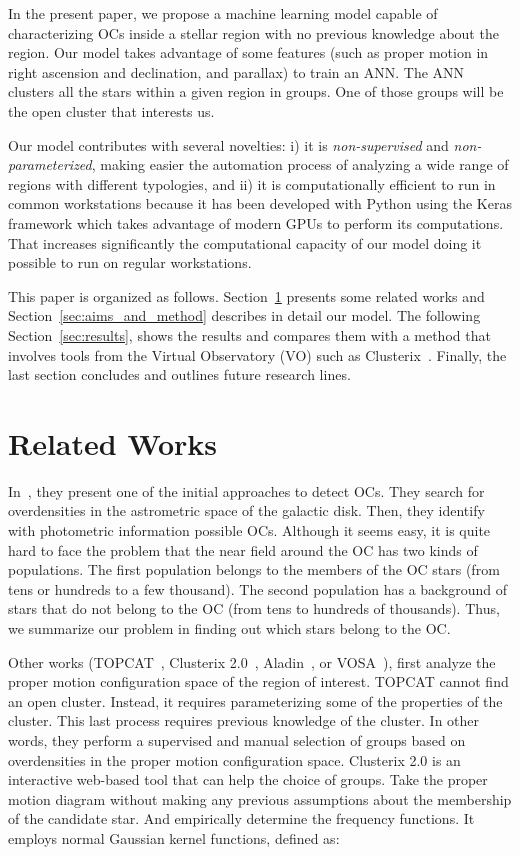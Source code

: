 \documentclass[11pt,a4paper,english,twocolumn]{article}
\begin{document}
In the present paper, we propose a machine learning model capable of characterizing
OCs inside a stellar region with no previous knowledge about the region.
Our model takes advantage of some features (such as proper motion in right ascension
and declination, and parallax) to train an ANN.
The ANN clusters all the stars within a given region in groups.
One of those groups will be the open cluster that interests us.

Our model contributes with several novelties: i) it is \emph{non-supervised} and
\emph{non-parameterized}, making easier the automation process of analyzing a
wide range of regions with different typologies, and ii) it is computationally
efficient to run in common workstations because it has been developed with
Python using the Keras framework which takes advantage of modern GPUs to perform
its computations. That increases significantly the computational capacity of
our model doing it possible to run on regular workstations.

This paper is organized as follows. Section~\ref{sec:related_works} presents
some related works and Section~\ref{sec:aims_and_method} describes in detail
our model. The following Section~\ref{sec:results}, shows the results and compares
them with a method that involves tools from the Virtual Observatory (VO) such as
Clusterix~\cite{balaguer2020clusterix}. Finally, the last section concludes and
outlines future research lines.

\section{Related Works}
\label{sec:related_works}

In~\cite{castro2020hunting}, they present one of the initial approaches to detect OCs.
They search for overdensities in the astrometric space of the galactic disk. Then,
they identify with photometric information possible OCs. Although it seems easy,
it is quite hard to face the problem that the near field around the OC has two kinds of
populations. The first population belongs to the members of the OC stars (from tens or
hundreds to a few thousand). The second population has a background of stars that do
not belong to the OC (from tens to hundreds of thousands). Thus, we summarize our problem
in finding out which stars belong to the OC.

Other works (TOPCAT~\cite{taylor2005topcat}, Clusterix 2.0~\cite{balaguer2020clusterix},
Aladin~\cite{bonnarel2000aladin}, or VOSA~\cite{bayo2008vosa}), first analyze the proper
motion configuration space of the region of interest. TOPCAT cannot find an open cluster.
Instead, it requires parameterizing some of the properties of the cluster. This last
process requires previous knowledge of the cluster. In other words, they perform a supervised
and manual selection of groups based on overdensities in the proper motion configuration space.
Clusterix 2.0 is an interactive web-based tool that can help the choice of groups. Take the
proper motion diagram without making any previous assumptions about the membership of the
candidate star. And empirically determine the frequency functions. It employs normal Gaussian
kernel functions, defined as:
\end{document}
